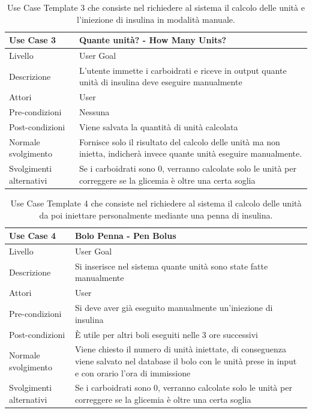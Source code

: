 \documentclass[twocolumn]{article}
\begin{document}
\begin{table}
    \centering
    \captionsetup{justification=centering}
    \begin{tabular}{|p{4.5cm}|p{9.5cm}|}
        \hline
        Use Case 3 & Quante unità? - How Many Units?\\
        \hline
        Livello & User Goal \\
        \hline
        Descrizione & L'utente immette i carboidrati e riceve in output quante unità di insulina deve eseguire manualmente\\
        \hline
        Attori & User \\
        \hline
        Pre-condizioni & Nessuna\\
        \hline
        Post-condizioni & Viene salvata la quantità di unità calcolata\\
        \hline
        Normale svolgimento & Fornisce solo il risultato del calcolo delle unità ma non inietta, indicherà invece quante unità eseguire manualmente.\\
        \hline
        Svolgimenti alternativi & Se i carboidrati sono 0, verranno calcolate solo le unità per correggere se la glicemia è oltre una certa soglia\\
        \hline
    \end{tabular}
    \caption{Use Case Template 3 che consiste nel richiedere al sistema il calcolo delle unità e l'iniezione di insulina in modalità manuale.}
    \label{tab:uc3}
\end{table}

\begin{table}
    \centering
    \captionsetup{justification=centering}
    \begin{tabular}{|p{4.5cm}|p{9.5cm}|}
        \hline
        Use Case 4 & Bolo Penna - Pen Bolus\\
        \hline
        Livello & User Goal \\
        \hline
        Descrizione & Si inserisce nel sistema quante unità sono state fatte manualmente\\
        \hline
        Attori & User \\
        \hline
        Pre-condizioni & Si deve aver già eseguito manualmente un'iniezione di insulina\\
        \hline
        Post-condizioni & È utile per altri boli eseguiti nelle 3 ore successivi\\
        \hline
        Normale svolgimento & Viene chiesto il numero di unità iniettate, di conseguenza viene salvato nel database il bolo con le unità prese in input e con orario l'ora di immissione\\
        \hline
        Svolgimenti alternativi & Se i carboidrati sono 0, verranno calcolate solo le unità per correggere se la glicemia è oltre una certa soglia\\
        \hline
    \end{tabular}
    \caption{Use Case Template 4 che consiste nel richiedere al sistema il calcolo delle unità da poi iniettare personalmente mediante una penna di insulina.}
    \label{tab:uc4}
\end{table}
\end{document}
